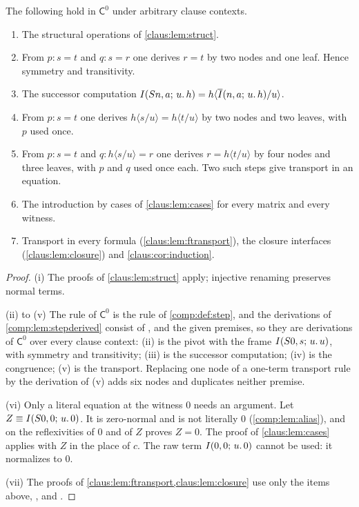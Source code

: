 \begin{lemma}
\label{claus:lem:c0}
The following hold in $\mathsf{C}^{0}$ under arbitrary clause contexts.
\begin{enumerate}[label=(\roman*)]
\item The structural operations of \cref{claus:lem:struct}.
\item From $p:s=t$ and $q:s=r$ one derives $r=t$ by two 
nodes and one  leaf. Hence symmetry and transitivity.
\item The successor computation
$I(S n,a;\,u.\,h)=h\langle\overline{I}(n,a;\,u.\,h)/u\rangle$.
\item From $p:s=t$ one derives $h\langle s/u\rangle=h\langle t/u\rangle$ by
two  nodes and two  leaves, with $p$ used
once.
\item From $p:s=t$ and $q:h\langle s/u\rangle=r$ one derives
$r=h\langle t/u\rangle$ by four  nodes and three
 leaves, with $p$ and $q$ used once each. Two such steps
give transport in an equation.
\item The introduction by cases of \cref{claus:lem:cases} for every matrix
and every witness.
\item Transport in every formula (\cref{claus:lem:ftransport}), the closure
interfaces (\cref{claus:lem:closure}) and \cref{claus:cor:induction}.
\end{enumerate}
\end{lemma}
\begin{proof}
(i) The proofs of \cref{claus:lem:struct} apply; injective renaming
preserves normal terms.

(ii) to (v) The rule  of $\mathsf{C}^{0}$ is the rule
 of \cref{comp:def:step}, and the derivations of
\cref{comp:lem:stepderived} consist of , 
and the given premises, so they are derivations of $\mathsf{C}^{0}$ over
every clause context: (ii) is the pivot with the frame
$I(S 0,s;\,u.\,u)$, with symmetry and transitivity; (iii) is the
successor computation; (iv) is the congruence; (v) is the transport.
Replacing one node of a one-term transport rule by the derivation of (v)
adds six nodes and duplicates neither premise.

(vi) Only a literal equation at the witness $0$ needs an argument. Let
$Z\equiv I(S 0,0;\,u.\,0)$. It is zero-normal and is not literally $0$
(\cref{comp:lem:alias}), and  on the reflexivities of $0$
and of $Z$ proves $Z=0$. The proof of \cref{claus:lem:cases} applies with
$Z$ in the place of $c$. The raw term $I(0,0;\,u.\,0)$ cannot be used: it
normalizes to $0$.

(vii) The proofs of \cref{claus:lem:ftransport,claus:lem:closure} use only
the items above, ,  and .
\end{proof}


